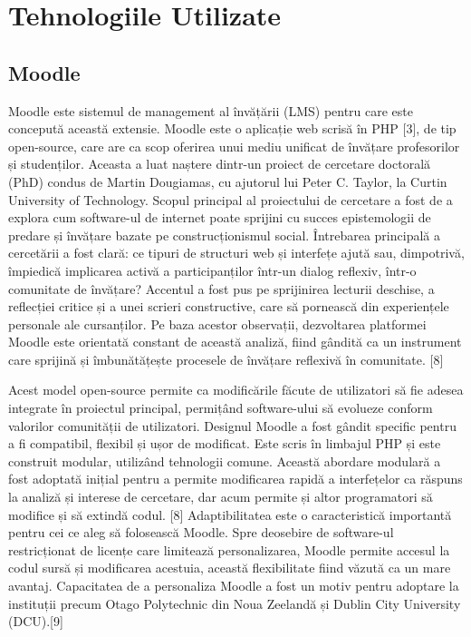 \chapter{Tehnologiile Utilizate}

\section{Moodle}

Moodle este sistemul de management al învățării (LMS) pentru care este concepută această extensie. Moodle este o aplicație web scrisă în PHP [3], de tip open-source, care are ca scop 
oferirea unui mediu unificat de învățare profesorilor și studenților. Aceasta a luat naștere dintr-un proiect de cercetare doctorală (PhD) condus de Martin Dougiamas, cu ajutorul lui 
Peter C. Taylor, la Curtin University of Technology. Scopul principal al proiectului de cercetare a fost de a explora cum software-ul de internet poate sprijini cu succes epistemologii 
de predare și învățare bazate pe construcționismul social. Întrebarea principală a cercetării a fost clară: ce tipuri de structuri web și interfețe ajută sau, dimpotrivă, împiedică 
implicarea activă a participanților într-un dialog reflexiv, într-o comunitate de învățare? Accentul a fost pus pe sprijinirea lecturii deschise, a reflecției critice și a unei scrieri 
constructive, care să pornească din experiențele personale ale cursanților. Pe baza acestor observații, dezvoltarea platformei Moodle este orientată constant de această analiză, 
fiind gândită ca un instrument care sprijină și îmbunătățește procesele de învățare reflexivă în comunitate. [8]

Acest model open-source permite ca modificările făcute de utilizatori să fie adesea integrate în proiectul principal, permițând 
software-ului să evolueze conform valorilor comunității de utilizatori. Designul Moodle a fost gândit specific pentru a fi compatibil, flexibil și ușor de modificat. 
Este scris în limbajul PHP și este construit modular, utilizând tehnologii comune. Această abordare modulară a fost adoptată inițial pentru a permite modificarea 
rapidă a interfețelor ca răspuns la analiză și interese de cercetare, dar acum permite și altor programatori să modifice și să extindă codul. [8] Adaptibilitatea este o caracteristică
importantă pentru cei ce aleg să folosească Moodle. Spre deosebire de software-ul restricționat de licențe care limitează personalizarea, Moodle permite accesul la codul sursă și 
modificarea acestuia, această flexibilitate fiind văzută ca un mare avantaj. Capacitatea de a personaliza Moodle a fost un motiv pentru adoptare la instituții precum Otago Polytechnic 
din Noua Zeelandă și  Dublin City University (DCU).[9]

